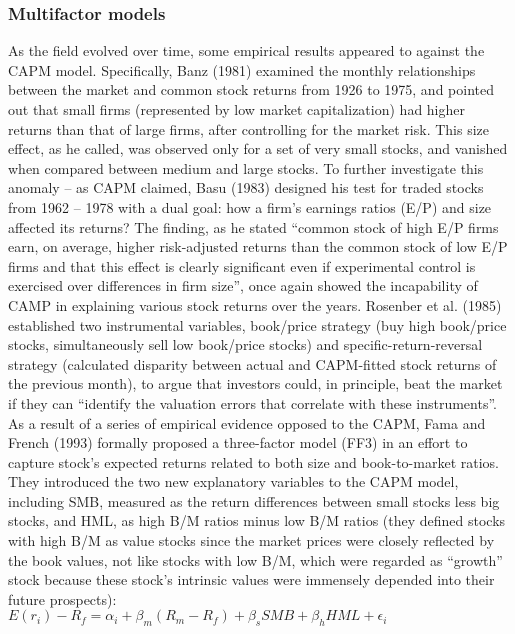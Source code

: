 \subsubsection{Multifactor models}
As the field evolved over time, some empirical results appeared to against the CAPM model. Specifically, Banz (1981) examined the monthly relationships between the market and common stock returns from 1926 to 1975, and pointed out that small firms (represented by low market capitalization) had higher returns than that of large firms, after controlling for the market risk. This size effect, as he called, was observed only for a set of very small stocks, and vanished when compared between medium and large stocks. To further investigate this anomaly – as CAPM claimed, Basu (1983) designed his test for traded stocks from 1962 – 1978 with a dual goal: how a firm’s earnings ratios (E/P) and size affected its returns? The finding, as he stated “common stock of high E/P firms earn, on average, higher risk-adjusted returns than the common stock of low E/P firms and that this effect is clearly significant even if experimental control is exercised over differences in firm size”, once again showed the incapability of CAMP in explaining various stock returns over the years. Rosenber et al. (1985) established two instrumental variables, book/price strategy (buy high book/price stocks, simultaneously sell low book/price stocks) and specific-return-reversal strategy (calculated disparity between actual and CAPM-fitted stock returns of the previous month), to argue that investors could, in principle, beat the market if they can “identify the valuation errors that correlate with these instruments”.
As a result of a series of empirical evidence opposed to the CAPM, Fama and French (1993) formally proposed a three-factor model (FF3) in an effort to capture stock’s expected returns related to both size and book-to-market ratios. They introduced the two new explanatory variables to the CAPM model, including SMB, measured as the return differences between small stocks less big stocks, and HML, as high B/M ratios minus low B/M ratios (they defined stocks with high B/M as value stocks since the market prices were closely reflected by the book values, not like stocks with low B/M, which were regarded as “growth” stock because these stock’s intrinsic values were immensely depended into their future prospects):\\
$ E(r_i)-R_f=\alpha_i+\beta_m(R_m-R_f)+\beta_sSMB+\beta_h HML+\epsilon_i $\\

